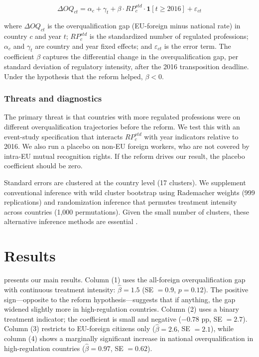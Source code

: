 \documentclass[12pt]{article}
\begin{document}
\begin{equation}\label{eq:main}
\Delta OQ_{ct} = \alpha_c + \gamma_t + \beta \cdot RP_c^{std} \cdot \mathbf{1}[t \geq 2016] + \varepsilon_{ct}
\end{equation}

\noindent where $\Delta OQ_{ct}$ is the overqualification gap (EU-foreign minus national rate) in country $c$ and year $t$; $RP_c^{std}$ is the standardized number of regulated professions; $\alpha_c$ and $\gamma_t$ are country and year fixed effects; and $\varepsilon_{ct}$ is the error term. The coefficient $\beta$ captures the differential change in the overqualification gap, per standard deviation of regulatory intensity, after the 2016 transposition deadline. Under the hypothesis that the reform helped, $\beta < 0$.

\subsubsection*{Threats and diagnostics} The primary threat is that countries with more regulated professions were on different overqualification trajectories before the reform. We test this with an event-study specification that interacts $RP_c^{std}$ with year indicators relative to 2016. We also run a placebo on non-EU foreign workers, who are not covered by intra-EU mutual recognition rights. If the reform drives our result, the placebo coefficient should be zero.

Standard errors are clustered at the country level (17 clusters). We supplement conventional inference with wild cluster bootstrap using Rademacher weights (999 replications) and randomization inference that permutes treatment intensity across countries (1,000 permutations). Given the small number of clusters, these alternative inference methods are essential \citep{cameron2008}.


\section{Results}\label{sec:results}



 presents our main results. Column (1) uses the all-foreign overqualification gap with continuous treatment intensity: $\hat\beta = 1.5$ (SE $= 0.9$, $p = 0.12$). The positive sign---opposite to the reform hypothesis---suggests that if anything, the gap widened slightly more in high-regulation countries. Column (2) uses a binary treatment indicator; the coefficient is small and negative ($-0.78$ pp, SE $= 2.7$). Column (3) restricts to EU-foreign citizens only ($\hat\beta = 2.6$, SE $= 2.1$), while column (4) shows a marginally significant increase in national overqualification in high-regulation countries ($\hat\beta = 0.97$, SE $= 0.62$).
\end{document}
